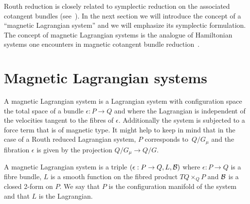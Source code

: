 \documentclass[pdftex]{sigma}
\newcommand{\B}{{\cal B}}
\newcommand{\e}{\epsilon}
\begin{document}
Routh reduction is closely related to symplectic reduction on the associated cotangent bundles (see~\cite{BC,marsdenrouth}). In the next section we will introduce the concept of a ``magnetic Lagrangian system'' and we will emphasize its symplectic formulation. The concept of magnetic Lagrangian systems is the analogue of Hamiltonian systems one encounters in magnetic cotangent bundle reduction~\cite{MarsdenHamRed}.

\section{Magnetic Lagrangian systems}\label{section3}

A magnetic Lagrangian system is a Lagrangian system with conf\/iguration space the total space of a bundle $\e:P\to Q$ and where the Lagrangian is independent of the velocities tangent to the f\/ibres of $\e$. Additionally the system is subjected to a force term that is of magnetic type. It might help to keep in mind that in the case of a Routh reduced Lagrangian system, $P$ corresponds to~$Q/G_\mu$ and the f\/ibration $\e$ is given by the projection $Q/G_\mu \to Q/G$.

\begin{definition} A magnetic Lagrangian system is a triple $(\e:P\to Q, L, \B)$ where $\e:P\to Q$ is a f\/ibre bundle, $L$ is a smooth function on the f\/ibred product $TQ\times_Q P$ and $\B$ is a closed 2-form on $P$. We say that $P$ is the conf\/iguration manifold of the system and that $L$ is the Lagrangian. \end{definition}
\end{document}
